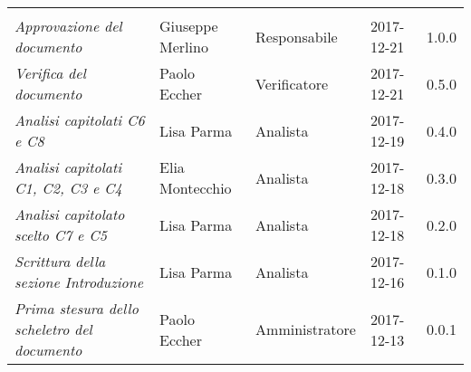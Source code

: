 \newpage 
\section*{}
\begin{table}[H]
	\centering
	\begin{tabular}{p{4cm}|C{3cm}|C{3cm}|R{2.5cm}|R{2cm}}
		
		 & & & & \\
		
		
		\emph{Approvazione del documento} & Giuseppe Merlino & Responsabile & 2017-12-21 & 1.0.0 \\
		\hline
		
		\emph{Verifica del documento} & Paolo Eccher & Verificatore & 2017-12-21 & 0.5.0 \\
		\hline
		
		\emph{Analisi capitolati C6 e C8 } & Lisa Parma & Analista & 2017-12-19 & 0.4.0 \\
		\hline
		
		\emph{Analisi capitolati C1, C2, C3 e C4 } & Elia Montecchio & Analista & 2017-12-18 & 0.3.0 \\
		\hline
		
		\emph{Analisi capitolato scelto C7 e C5 } & Lisa Parma & Analista & 2017-12-18 & 0.2.0 \\
		\hline
		
		\emph{Scrittura della sezione Introduzione } & Lisa Parma & Analista & 2017-12-16 & 0.1.0 \\
		\hline
		
		\emph{Prima stesura dello scheletro del documento} & Paolo Eccher & Amministratore & 2017-12-13 & 0.0.1 \\
		
	\end{tabular}
	
\end{table}


\clearpage